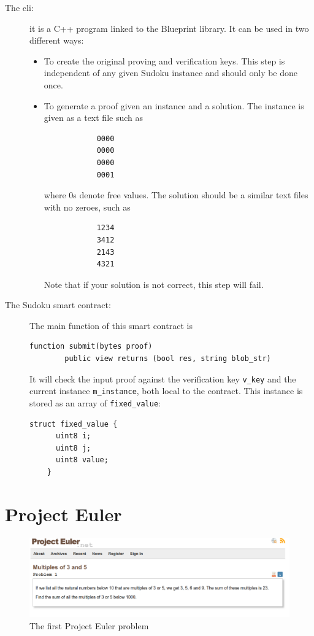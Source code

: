 \documentclass[10pt,a4paper]{article}
\begin{document}
\begin{description}
	\item[The cli:] it is a C++ program linked to the Blueprint \zksnarks{} library. It can be used in two different ways:
	\begin{itemize}
		\item To create the original proving and verification keys. This step is independent of any given Sudoku instance and should only be done once.
		\item To generate a proof given an instance and a solution. The instance is given as a text file such as

		\begin{verbatim}
			0000
			0000
			0000
			0001
		\end{verbatim}

		where $0$s denote free values. The solution should be a similar text files with no zeroes, such as

		\begin{verbatim}
			1234
			3412
			2143
			4321
		\end{verbatim}

		Note that if your solution is not correct, this step will fail.
	\end{itemize}
    \item[The Sudoku smart contract:] The main function of this smart contract is
    \begin{lstlisting}[language=Solidity]
    function submit(bytes proof)
        public view returns (bool res, string blob_str)
    \end{lstlisting}
    It will check the input proof against the verification key \lstinline[language=Solidity]|v_key| and the current instance \lstinline[language=Solidity]|m_instance|, both local to the contract. This instance is stored as an array of \lstinline[language=Solidity]|fixed_value|:
    \begin{lstlisting}[language=Solidity]
    struct fixed_value {
      uint8 i;
      uint8 j;
      uint8 value;
    }

    \end{lstlisting}
\end{description}

\section{Project Euler}
\label{section_euler}

	\begin{figure}[!h]
	\centering
	\includegraphics[width=\textwidth]{euler}
	\caption{The first Project Euler problem}
\end{figure}
\end{document}
